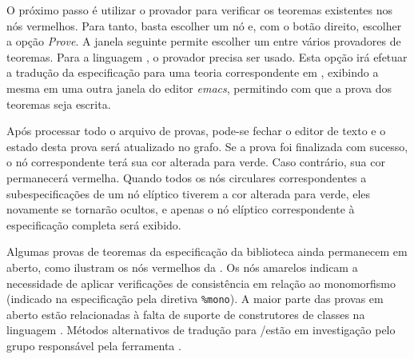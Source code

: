 O próximo passo é utilizar o provador \Isabelle para verificar os teoremas existentes nos nós vermelhos. Para tanto, basta escolher um nó e, com o botão direito, escolher a opção \textit{Prove}. A janela seguinte permite escolher um entre vários provadores de teoremas. Para a linguagem \HasCASL, o provador \Isabelle precisa ser usado. Esta opção irá efetuar a tradução da especificação para uma teoria correspondente em \HOL, exibindo a mesma em uma outra janela do editor \textit{emacs}, permitindo com que a prova dos teoremas seja escrita.

Após processar todo o arquivo de provas, pode-se fechar o editor de texto e o estado desta prova será atualizado no grafo. Se a prova foi finalizada com sucesso, o nó correspondente terá sua cor alterada para verde. Caso contrário, sua cor permanecerá vermelha. Quando todos os nós circulares correspondentes a subespecificações de um nó elíptico tiverem a cor alterada para verde, eles novamente se tornarão ocultos, e apenas o nó elíptico correspondente à especificação completa será exibido.

Algumas provas de teoremas da especificação da biblioteca ainda permanecem em aberto, como ilustram os nós vermelhos da . Os nós amarelos indicam a necessidade de aplicar verificações de consistência em relação ao monomorfismo (indicado na especificação pela diretiva \Verb_%mono_). A maior parte das provas em aberto estão relacionadas à falta de suporte de construtores de classes na linguagem \HOL. Métodos alternativos de tradução para \Isabelle/\HOL estão em investigação pelo grupo responsável pela ferramenta \Hets.

